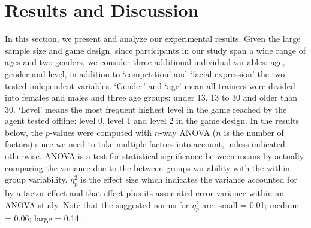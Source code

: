 \documentclass[10pt,journal,compsoc]{IEEEtran}
\begin{document}
\section{Results and Discussion}
\label{sec:re}

In this section, we present and analyze our experimental results. Given the large sample size and game design, since participants in our study span a wide range of ages and two genders, we consider three additional individual variables: age, gender and level, in addition to `competition' and `facial expression' the two tested independent variables. %
`Gender' and `age' mean all trainers were divided into females and males and three age groups: under 13, 13 to 30 and older than 30. %
`Level' means the most frequent highest level in the game reached by the agent tested offline: level 0, level 1 and level 2 in the game design.
In the results below, the $p$-values were computed with $n$-way ANOVA ($n$ is the number of factors) since we need to take multiple factors into account, unless indicated otherwise. ANOVA is a test for statistical significance between means by actually comparing the variance due to the between-groups variability with the within-group variability. %
$\eta_{p}^{2}$ is the effect size which indicates %
the variance accounted for by a factor effect and that effect plus its associated error variance within an ANOVA study. Note that the suggested norms for $\eta_{p}^{2}$ are: small = 0.01; medium = 0.06; large = 0.14.  %
\end{document}

